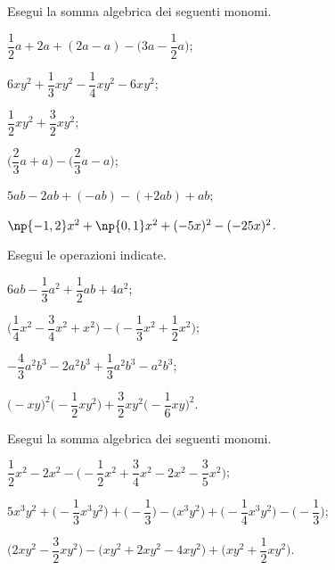 \begin{esercizio}[\Ast]
 \label{ese:10.29} %
Esegui la somma algebrica dei seguenti monomi.
\begin{multicols}{2}
\begin{enumeratea}
\spazielenx
 \item $\dfrac{1}{2}a+2a+(2a-a)-\bigg(3a-\dfrac{1}{2}a\bigg)$;
 \item $6xy^{2}+\dfrac{1}{3}xy^{2}-\dfrac{1}{4}xy^{2}-6xy^{2}$;
 \item $\dfrac{1}{2}xy^{2}+\dfrac{3}{2}xy^{2}$;
 \item $\bigg(\dfrac{2}{3}a+a\bigg)-\bigg(\dfrac{2}{3}a-a\bigg)$;
 \item $5ab-2ab+(-ab)-(+2ab)+ab$;
 \item $\np{-1,2}x^{2}+\np{0,1}x^{2}+(-5x)^{2}-(-25x)^{2}$.
\end{enumeratea}
\end{multicols}

\end{esercizio}

\begin{esercizio}[\Ast]
 \label{ese:10.30} %
Esegui le operazioni indicate.
\begin{multicols}{2}
\begin{enumeratea}
\spazielenx
 \item $6ab-\dfrac{1}{3}a^{2}+\dfrac{1}{2}ab+4a^{2}$;
 \item $\bigg(\dfrac{1}{4}x^{2}-\dfrac{3}{4}x^{2}+x^{2}\bigg)-\bigg(-{\dfrac{1}{3}}x^{2}+\dfrac{1}{2}x^{2}\bigg)$;
 \item $-{\dfrac{4}{3}}a^{2}b^{3}-2a^{2}b^{3}+\dfrac{1}{3}a^{2}b^{3}-a^{2}b^{3}$;
 \item $\big(-xy\big)^{2}\bigg(-{\dfrac{1}{2}}xy^{2}\bigg)+\dfrac{3}{2}xy^{2}\bigg(-{\dfrac{1}{6}}xy\bigg)^{2}$.
\end{enumeratea}
\end{multicols}
\end{esercizio}

\begin{esercizio}[\Ast]
 \label{ese:10.31} %
Esegui la somma algebrica dei seguenti monomi.

\begin{enumeratea}
\spazielenx
 \item $\dfrac{1}{2}x^{2}-2x^{2}-\bigg(-{\dfrac{1}{2}}x^{2}+\dfrac{3}{4}x^{2}-2x^{2}-\dfrac{3}{5}x^{2}\bigg)$;
 \item $5x^{3}y^{2}+\bigg(-{\dfrac{1}{3}}x^{3}y^{2}\bigg)+\bigg(-{\dfrac{1}{3}}\bigg)-\big(x^{3}y^{2}\big)+\bigg(-{\dfrac{1}{4}}x^{3}y^{2}\bigg)-\bigg(-{\dfrac{1}{3}}\bigg)$;
 \item $\bigg(2xy^{2}-\dfrac{3}{2}xy^{2}\bigg)-\big(xy^{2}+2xy^{2}-4xy^{2}\big)+\bigg(xy^{2}+\dfrac{1}{2}xy^{2}\bigg)$.
\end{enumeratea}
\end{esercizio}

